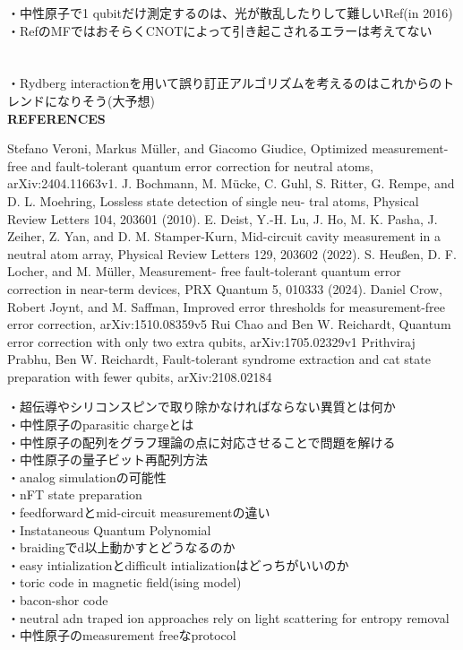 \documentclass[a4paper,10.5pt]{ltjsarticle}
\begin{document}
・中性原子で1 qubitだけ測定するのは、光が散乱したりして難しいRef\cite{5}(in 2016)\\
・Ref\cite{5}のMFではおそらくCNOTによって引き起こされるエラーは考えてない\\
\\
\\
・Rydberg interactionを用いて誤り訂正アルゴリズムを考えるのはこれからのトレンドになりそう(大予想)\\
\clearpage
{\Large \bfseries REFERENCES}
\begin{thebibliography}{1}
\vspace{-1.5cm}
   Stefano Veroni, Markus Müller, and Giacomo Giudice, Optimized measurement-free and fault-tolerant quantum error correction for neutral atoms, arXiv:2404.11663v1.
   J. Bochmann, M. Mücke, C. Guhl, S. Ritter, G. Rempe, and D. L. Moehring, Lossless state detection of single neu- tral atoms, Physical Review Letters 104, 203601 (2010).
   E. Deist, Y.-H. Lu, J. Ho, M. K. Pasha, J. Zeiher, Z. Yan, and D. M. Stamper-Kurn, Mid-circuit cavity measurement in a neutral atom array, Physical Review Letters 129, 203602 (2022).
   S. Heußen, D. F. Locher, and M. Müller, Measurement- free fault-tolerant quantum error correction in near-term devices, PRX Quantum 5, 010333 (2024).
   Daniel Crow, Robert Joynt, and M. Saffman, Improved error thresholds for measurement-free error correction, arXiv:1510.08359v5
   Rui Chao and Ben W. Reichardt, Quantum error correction with only two extra qubits, arXiv:1705.02329v1
   Prithviraj Prabhu, Ben W. Reichardt, Fault-tolerant syndrome extraction and cat state preparation with fewer qubits, arXiv:2108.02184
\end{thebibliography}
\vspace{50pt}
・超伝導やシリコンスピンで取り除かなければならない異質とは何か\\
・中性原子のparasitic chargeとは\\
・中性原子の配列をグラフ理論の点に対応させることで問題を解ける\\
・中性原子の量子ビット再配列方法\\
・analog simulationの可能性\\
・nFT state preparation\\
・feedforwardとmid-circuit measurementの違い\\
・Instataneous Quantum Polynomial\\
・braidingでd以上動かすとどうなるのか\\
・easy intializationとdifficult intializationはどっちがいいのか\\
・toric code in magnetic field(ising model)\\
・bacon-shor code\\
・neutral adn traped ion approaches rely on light scattering for entropy removal\\
・中性原子のmeasurement freeなprotocol\\　
\\
\end{document}
